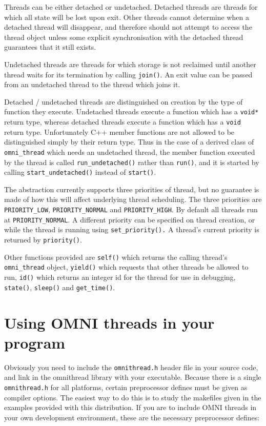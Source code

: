 \documentclass[11pt,twoside,a4paper]{article}
\newcommand{\dsc}{\discretionary{}{}}
\begin{document}
Threads can be either detached or undetached.  Detached threads are
threads for which all state will be lost upon exit.  Other threads
cannot determine when a detached thread will disappear, and therefore
should not attempt to access the thread object unless some explicit
synchronisation with the detached thread guarantees that it still
exists.

Undetached threads are threads for which storage is not reclaimed
until another thread waits for its termination by calling
\texttt{join()}.  An exit value can be passed from an undetached
thread to the thread which joins it.

Detached / undetached threads are distinguished on creation by the
type of function they execute.  Undetached threads execute a function
which has a \texttt{void*} return type, whereas detached threads
execute a function which has a \texttt{void} return type.
Unfortunately C++ member functions are not allowed to be distinguished
simply by their return type.  Thus in the case of a derived class of
\texttt{omni\_thread} which needs an undetached thread, the member
function executed by the thread is called \texttt{run\_undetached()}
rather than \texttt{run()}, and it is started by calling
\texttt{start\_\dsc{}undetached()} instead of \texttt{start()}.

The abstraction currently supports three priorities of thread, but no
guarantee is made of how this will affect underlying thread
scheduling.  The three priorities are \texttt{PRIORITY\_LOW},
\texttt{PRIORITY\_NORMAL} and \texttt{PRIORITY\_HIGH}.  By default all
threads run at \texttt{PRIORITY\_NORMAL}.  A different priority can be
specified on thread creation, or while the thread is running using
\texttt{set\_priority().}  A thread's current priority is returned by
\texttt{priority()}.

Other functions provided are \texttt{self()} which returns the calling
thread's \texttt{omni\_\dsc{}thread} object, \texttt{yield()} which
requests that other threads be allowed to run, \texttt{id()} which
returns an integer id for the thread for use in debugging,
\texttt{state()}, \texttt{sleep()} and \texttt{get\_time()}.

\section{Using OMNI threads in your program}

Obviously you need to include the \texttt{omnithread.h} header file in
your source code, and link in the omnithread library with your
executable.  Because there is a single \texttt{omnithread.h} for all
platforms, certain preprocessor defines must be given as compiler
options.  The easiest way to do this is to study the makefiles given
in the examples provided with this distribution.  If you are to
include OMNI threads in your own development environment, these are
the necessary preprocessor defines:
\end{document}
